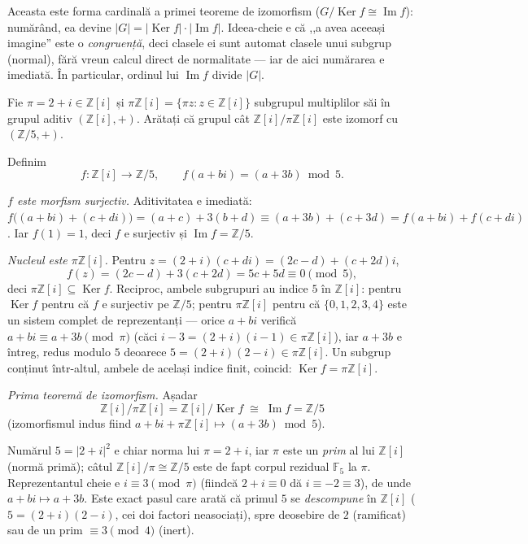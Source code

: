 \begin{obs}
Aceasta este forma cardinală a primei teoreme de izomorfism
($G/\operatorname{Ker}f\cong\operatorname{Im}f$): numărând, ea devine
$|G|=|\operatorname{Ker}f|\cdot|\operatorname{Im}f|$. Ideea-cheie e că
,,a avea aceeași imagine'' este o \emph{congruență}, deci clasele
ei sunt automat clasele unui subgrup (normal), fără vreun calcul
direct de normalitate --- iar de aici numărarea e imediată. În
particular, ordinul lui $\operatorname{Im}f$ divide $|G|$.
\end{obs}

\begin{problema}
Fie $\pi=2+i\in\mathbb{Z}[i]$ și $\pi\mathbb{Z}[i]=\{\pi z : z\in\mathbb{Z}[i]\}$
subgrupul multiplilor săi în grupul aditiv $(\mathbb{Z}[i],+)$.
Arătați că grupul cât $\mathbb{Z}[i]/\pi\mathbb{Z}[i]$ este
izomorf cu $(\mathbb{Z}/5,+)$.
\end{problema}

\begin{solutie}
Definim
\[
  f:\mathbb{Z}[i]\to\mathbb{Z}/5,\qquad f(a+bi)=(a+3b)\bmod 5 .
\]

\textit{$f$ este morfism surjectiv.} Aditivitatea e imediată:
$f\bigl((a+bi)+(c+di)\bigr)=(a+c)+3(b+d)\equiv(a+3b)+(c+3d)=f(a+bi)+f(c+di)$.
Iar $f(1)=1$, deci $f$ e surjectiv și $\operatorname{Im}f=\mathbb{Z}/5$.

\textit{Nucleul este $\pi\mathbb{Z}[i]$.} Pentru $z=(2+i)(c+di)=(2c-d)+(c+2d)i$,
\[
  f(z)=(2c-d)+3(c+2d)=5c+5d\equiv 0\pmod 5 ,
\]
deci $\pi\mathbb{Z}[i]\subseteq\operatorname{Ker}f$. Reciproc, ambele subgrupuri
au indice $5$ în $\mathbb{Z}[i]$: pentru $\operatorname{Ker}f$ pentru
că $f$ e surjectiv pe $\mathbb{Z}/5$; pentru $\pi\mathbb{Z}[i]$ pentru
că $\{0,1,2,3,4\}$ este un sistem complet de reprezentanți --- orice
$a+bi$ verifică $a+bi\equiv a+3b\pmod{\pi}$ (căci $i-3=(2+i)(i-1)\in\pi\mathbb{Z}[i]$),
iar $a+3b$ e întreg, redus modulo $5$ deoarece $5=(2+i)(2-i)\in\pi\mathbb{Z}[i]$.
Un subgrup conținut într-altul, ambele de același indice finit,
coincid: $\operatorname{Ker}f=\pi\mathbb{Z}[i]$.

\textit{Prima teoremă de izomorfism.} Așadar
\[
  \boxed{\;\mathbb{Z}[i]/\pi\mathbb{Z}[i]=\mathbb{Z}[i]/\operatorname{Ker}f\;\cong\;\operatorname{Im}f=\mathbb{Z}/5\;}
\]
(izomorfismul indus fiind $a+bi+\pi\mathbb{Z}[i]\mapsto(a+3b)\bmod 5$).
\end{solutie}

\begin{obs}
Numărul $5=|2+i|^{2}$ e chiar norma lui $\pi=2+i$, iar $\pi$ este un
\emph{prim} al lui $\mathbb{Z}[i]$ (normă primă); câtul
$\mathbb{Z}[i]/\pi\cong\mathbb{Z}/5$ este de fapt corpul rezidual
$\mathbb{F}_{5}$ la $\pi$. Reprezentantul cheie e $i\equiv 3\pmod{\pi}$
(fiindcă $2+i\equiv 0$ dă $i\equiv-2\equiv 3$), de unde
$a+bi\mapsto a+3b$. Este exact pasul care arată că primul $5$ se
\emph{descompune} în $\mathbb{Z}[i]$ ($5=(2+i)(2-i)$, cei doi factori
neasociați), spre deosebire de $2$ (ramificat) sau de un prim
$\equiv 3\pmod 4$ (inert).
\end{obs}

